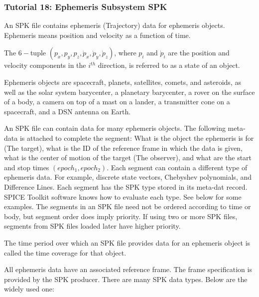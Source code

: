 \documentclass[crop=false,class=book]{standalone}
\begin{document}
            \subsubsection{Tutorial 18: Ephemeris Subsystem SPK}
            An SPK file contains ephemeris (Trajectory) data for ephemeris objects. Ephemeris means position and velocity as a function of time.
            \begin{definition}
            The $6-$tuple $(p_{x},p_{y},p_{z},\dot{p}_{x},\dot{p}_{y},\dot{p}_{z})$, where $p_{i}$ and $\dot{p}_{i}$ are the position and velocity components in the $i^{th}$ direction, is referred to as a state of an object.
            \end{definition}
            \begin{definition}
            Ephemeris objects are spacecraft, planets, satellites, comets, and asteroids, as well as the solar system barycenter, a planetary barycenter, a rover on the surface of a body, a camera on top of a mast on a lander, a transmitter cone on a spacecraft, and a DSN antenna on Earth.
            \end{definition}
            An SPK file can contain data for many ephemeris objects.
            The following meta-data is attached to complete the segment: What is the object the ephemeris is for (The target), what is the ID of the reference frame in which the data is given, what is the center of motion of the target (The observer), and what are the start and stop times $(epoch_1, epoch_2)$. Each segment can contain a different type of ephemeris data. For example, discrete state vectors, Chebyshev polynomials, and Difference Lines. Each segment has the SPK type stored in its meta-dat record. SPICE Toolkit software knows how to evaluate each type. See below for some examples. The segments in an SPK file need not be ordered according to time or body, but segment order does imply priority. If using two or more SPK files, segments from SPK files loaded later have higher priority. 
            \begin{definition}
            The time period over which an SPK file provides data for an ephemeris object is called the time coverage for that object.
            \end{definition}
            All ephemeris data have an associated reference frame. The frame specification is provided by the SPK producer. There are many SPK data types. Below are the widely used one:
\end{document}
